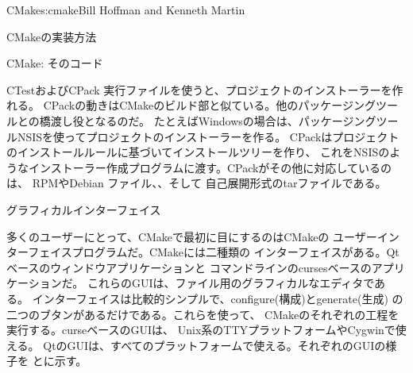 \begin{aosachapter}{CMake}{s:cmake}{Bill Hoffman and Kenneth Martin}
\begin{aosasect1}{CMakeの実装方法}
\begin{aosasect2}{CMake: そのコード}
\begin{aosasect3}{CTestおよびCPack}
実行ファイルを使うと、プロジェクトのインストーラーを作れる。
CPackの動きはCMakeのビルド部と似ている。他のパッケージングツールとの橋渡し役となるのだ。
たとえばWindowsの場合は、パッケージングツールNSISを使ってプロジェクトのインストーラーを作る。
CPackはプロジェクトのインストールルールに基づいてインストールツリーを作り、
これをNSISのようなインストーラー作成プログラムに渡す。CPackがその他に対応しているのは、
RPMやDebian ファイル、、そして
自己展開形式のtarファイルである。

\end{aosasect3}

\end{aosasect2}

\begin{aosasect2}{グラフィカルインターフェイス}

多くのユーザーにとって、CMakeで最初に目にするのはCMakeの
ユーザーインターフェイスプログラムだ。CMakeには二種類の
インターフェイスがある。Qtベースのウィンドウアプリケーションと
コマンドラインのcursesベースのアプリケーションだ。
これらのGUIは、ファイル用のグラフィカルなエディタである。
インターフェイスは比較的シンプルで、configure(構成)とgenerate(生成)
の二つのブタンがあるだけである。これらを使って、
CMakeのそれぞれの工程を実行する。curseベースのGUIは、
Unix系のTTYプラットフォームやCygwinで使える。
QtのGUIは、すべてのプラットフォームで使える。それぞれのGUIの様子を
とに示す。


\end{aosasect2}
\end{aosasect1}
\end{aosachapter}
